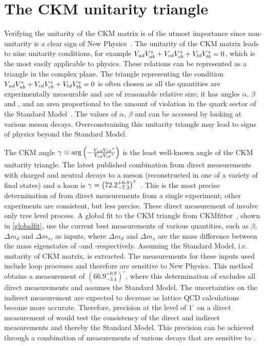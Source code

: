 \section{The CKM unitarity triangle}

Verifying the unitarity of the CKM matrix is of the utmost importance since non-unitarity is a clear sign of New Physics~\cite{CKMtriangle}. The unitarity of the CKM matrix leads to nine unitarity conditions, for example ${V_{{u}{d}}}{V_{{u}{b}}^\ast} + {V_{{c}{d}}}{V_{{c}{b}}^\ast} + {V_{{t}{d}}}{V_{{t}{b}}^\ast} = 0$, which is the most easily applicable to \B physics. These relations can be represented as a triangle in the complex plane. The triangle representing the condition ${V_{{u}{d}}}{V_{{u}{b}}^\ast} + {V_{{c}{d}}}{V_{{c}{b}}^\ast} + {V_{{t}{d}}}{V_{{t}{b}}^\ast} = 0$ is often chosen as all the quantities are experimentally measurable and are of reasonable relative size; it has angles $\alpha$, $\beta$ and \Pgamma, and an area proportional to the amount of \CP violation in the quark sector of the Standard Model~\cite{CKMtriangle}. The values of $\alpha$, $\beta$ and \Pgamma can be accessed by looking at various \B meson decays. Overconstraining this unitarity triangle may lead to signs of physics beyond the Standard Model. 

The CKM angle $\gamma \equiv \arg\left(-\frac{{V_{{u}{d}}}{{V_{{u}{b}}}}^*}{{V_{{c}{d}}}{{V_{{c}{b}}}}^*}\right)$ is the least well-known angle of the CKM unitarity triangle. The latest published \lhcb combination from direct measurements with charged and neutral \B decays to a \D meson (reconstructed in one of a variety of final states) and a kaon is $\gamma = \left(72.2^{+6.8}_{-7.3}\right)^{\circ}$~\cite{LHCb-PAPER-2016-032}. This is the most precise determination of \Pgamma from direct measurements from a single experiment; other experiments are consistent, but less precise. These direct measurement of \Pgamma involve only tree level process. A global fit to the CKM triangle from CKMfitter~\cite{CKMFitter}, shown in \fig\ref{globalfit}, use the current best measurements of various quantities, such as $\beta$, $\Delta m_d$ and $\Delta m_s$, as inputs, where $\Delta m_d$ and $\Delta m_s$ are the mass difference between the mass eigenstates of \Bz-\Bzb and \Bs-\Bsb respectively. Assuming the Standard Model, i.e. unitarity of CKM matrix, \Pgamma is extracted. The measurements for these inputs used include loop processes and therefore are sensitive to New Physics. This method obtains a \Pgamma measurement of $(66.9^{+0.9}_{-3.4})^{\circ}$, where this determination of \Pgamma excludes all direct measurements and assumes the Standard Model. The uncertainties on the indirect measurement are expected to decrease as lattice QCD calculations become more accurate. Therefore, precision at the level of $1^\circ$ on a direct measurement of \Pgamma would test the consistency of the direct and indirect measurements and thereby the Standard Model. This precision can be achieved through a combination of measurements of various \B decays that are sensitive to \Pgamma.


